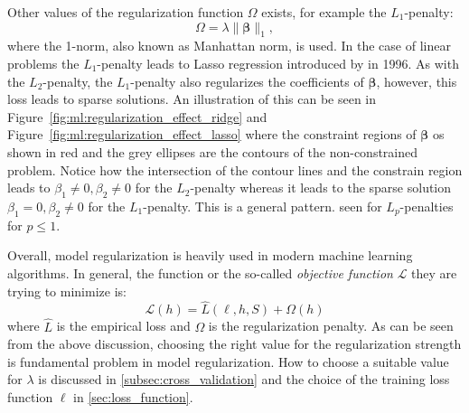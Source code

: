 \documentclass[a4paper, twoside, nobib]{tufte-book}
\newcommand{\norm}[1]{\lVert#1\rVert}
\begin{document}
Other values of the regularization function $\Omega$ exists, for example the $L_1$-penalty:
\begin{equation}
  \Omega = \lambda \norm{\bm{\beta}}_1, 
\end{equation}
where the 1-norm, also known as Manhattan norm, is used. In the case of linear problems the $L_1$-penalty leads to Lasso regression introduced by \citet{tibshiraniRegressionShrinkageSelection1996} in 1996. As with the $L_2$-penalty, the $L_1$-penalty also regularizes the coefficients of $\bm{\beta}$, however, this loss leads to sparse solutions. An illustration of this can be seen in Figure~\ref{fig:ml:regularization_effect_ridge} and Figure~\ref{fig:ml:regularization_effect_lasso} where the constraint regions of $\bm{\beta}$ os shown in red and the grey ellipses are the contours of the non-constrained problem. Notice how the intersection of the contour lines and the constrain region leads to $\beta_1 \neq 0, \beta_2 \neq 0$ for the $L_2$-penalty whereas it leads to the sparse solution $\beta_1=0, \beta_2 \neq 0$ for the $L_1$-penalty. This is a general pattern. seen for $L_p$-penalties for $p \leq 1$.

Overall, model regularization is heavily used in modern machine learning algorithms. In general, the function or the so-called \emph{objective function} $\mathcal{L}$ they are trying to minimize is:
\begin{equation}
  \mathcal{L}(h) = \hat{L}(\ell, h, S) + \Omega(h)
\end{equation}
where $\hat{L}$ is the empirical loss and $\Omega$ is the regularization penalty. As can be seen from the above discussion, choosing the right value for the regularization strength is fundamental problem in model regularization. How to choose a suitable value for $\lambda$ is discussed in \autoref{subsec:cross_validation} and the choice of the training loss function $\ell$ in \autoref{sec:loss_function}. 
\end{document}
